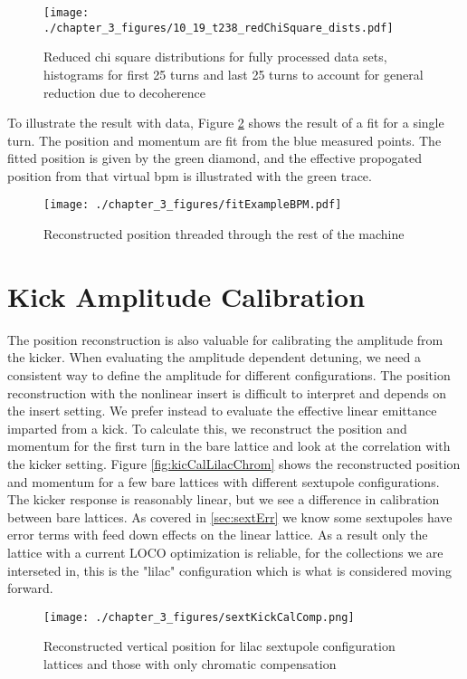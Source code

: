 \begin{figure}
    \centering
    \texttt{[image: ./chapter\_3\_figures/10\_19\_t238\_redChiSquare\_dists.pdf]}
    \caption{Reduced chi square distributions for fully processed data sets, histograms for first 25 turns and last 25 turns to account for general reduction due to decoherence}
    \label{fig:redChiDists}
\end{figure}

To illustrate the result with data, Figure \ref{fig:fitThread} shows the result of a fit for a single turn. The position and momentum are fit from the blue measured points. The fitted position is given by the green diamond, and the effective propogated position from that virtual bpm is illustrated with the green trace.

\begin{figure}
    \centering
    \texttt{[image: ./chapter\_3\_figures/fitExampleBPM.pdf]}
    \caption{Reconstructed position threaded through the rest of the machine}
    \label{fig:fitThread}
\end{figure}

\section{Kick Amplitude Calibration} \label{sec:kickAmpCal}
The position reconstruction is also valuable for calibrating the amplitude from the kicker. When evaluating the amplitude dependent detuning, we need a consistent way to define the amplitude for different configurations. The position reconstruction with the nonlinear insert is difficult to interpret and depends on the insert setting. We prefer instead to evaluate the effective linear emittance imparted from a kick. To calculate this, we reconstruct the position and momentum for the first turn in the bare lattice and look at the correlation with the kicker setting. Figure \ref{fig:kicCalLilacChrom} shows the reconstructed position and momentum for a few bare lattices with different sextupole configurations. The kicker response is reasonably linear, but we see a difference in calibration between bare lattices. As covered in \ref{sec:sextErr} we know some sextupoles have error terms with feed down effects on the linear lattice. As a result only the lattice with a current LOCO optimization is reliable, for the collections we are interseted in, this is the "lilac" configuration which is what is considered moving forward.


\begin{figure}
    \centering
    \texttt{[image: ./chapter\_3\_figures/sextKickCalComp.png]}
    \caption{Reconstructed vertical position for lilac sextupole configuration lattices and those with only chromatic compensation}
    \label{fig:kickCalLilacChrom}
\end{figure}

